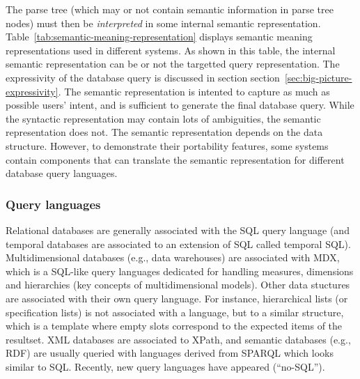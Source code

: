 \documentclass[10pt,journal,letterpaper,compsoc]{IEEEtran}
\begin{document}
The parse tree (which may or not contain semantic information in parse tree
nodes) must then be {\it interpreted} in some internal semantic representation.
Table~\ref{tab:semantic-meaning-representation} displays semantic meaning
representations used in different systems.
As shown in this table, the internal semantic representation can be or not the
targetted query representation. 
The expressivity of the database query is discussed in section
section~\ref{sec:big-picture-expressivity}. 
The semantic representation is intented to capture as much as possible users'
intent, and is sufficient to generate the final database query. 
While the syntactic representation may contain lots of ambiguities, the semantic
representation does not. 
The semantic representation depends on the data structure. However, to
demonstrate their portability features, some systems contain components that
can translate the semantic representation for different database query
languages.

\subsubsection{Query languages}
Relational databases are generally associated with the SQL query language (and
temporal databases are associated to an extension of SQL called temporal SQL).
Multidimensional databases (e.g., data warehouses) are associated with MDX,
which is a SQL-like query languages dedicated for handling measures, dimensions
and hierarchies (key concepts of multidimensional models).
Other data stuctures are associated with their own query language. For instance,
hierarchical lists (or specification lists) is not associated with a language,
but to a similar structure, which is a template where empty slots correspond to
the expected items of the resultset. XML databases are associated to XPath, and
semantic databases (e.g., RDF) are usually queried with languages derived from
SPARQL which looks similar to SQL.
Recently, new query languages have appeared (``no-SQL''). 
\end{document}

